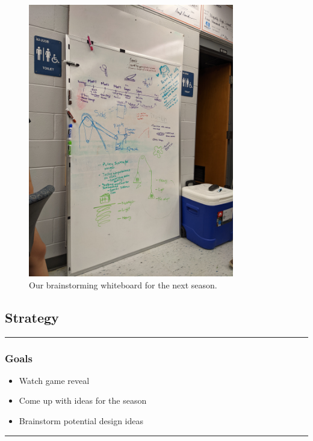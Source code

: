 \begin{figure}[ht]
\begin{minipage}[b]{.50\textwidth}
  \includegraphics[width=0.8\textwidth]{Meetings/September/09-18-21/PXL_20210918_184637754 - Jensen Miller.jpg}
  \caption{Our brainstorming whiteboard for the next season.}
  \label{fig:pic2}
\end{minipage}
\end{figure}

\subsection*{Strategy}
\noindent\hfil\rule{\textwidth}{.4pt}\hfil
\subsubsection*{Goals}
\begin{itemize}
    \item Watch game reveal
		\item Come up with ideas for the season
		\item Brainstorm potential design ideas

\end{itemize} 

\noindent\hfil\rule{\textwidth}{.4pt}\hfil

